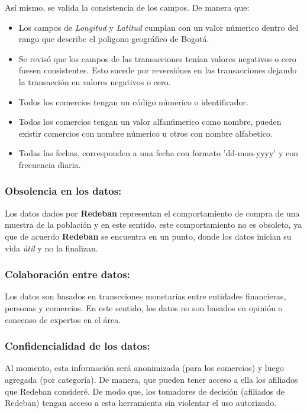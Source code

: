 \documentclass[a4paper]{article}
\begin{document}
Así mismo, se valida la consistencia de los campos. De manera que:

\begin{itemize}
	\item Los campos de \textit{Longitud} y \textit{Latitud} cumplan con un valor númerico dentro del rango que describe el poligono geográfico de Bogotá.
	\item Se revisó que los campos de las transacciones tenían valores negativos o cero fuesen consistentes. Esto sucede por reversiónes en las transacciones dejando la transacción en valores negativos o cero.
	\item Todos los comercios tengan un código númerico o identificador.
	\item Todos los comercios tengan un valor alfanúmerico como nombre, pueden existir comercios con nombre númerico u otros con nombre alfabetico.
	\item Todas las fechas, corresponden a una fecha con formato 'dd-mon-yyyy' y con frecuencia diaria.
\end{itemize}


\subsubsection*{Obsolencia en los datos:}

Los datos dados por \textbf{Redeban} representan el comportamiento de compra de una muestra de la población y
en este sentido, este comportamiento no es obsoleto, ya que de acuerdo \cite{ARTICLE:1} \textbf{Redeban} se encuentra en un punto,
donde los datos inician su vida \textit{útil} y no la finalizan.

\subsubsection*{Colaboración entre datos:}

Los datos son basados en transcciones monetarias entre entidades financieras, personas y comercios.
En este sentido, los datos no son basados en opinión o concenso de expertos en el área.

\subsubsection*{Confidencialidad de los datos:}

Al momento, esta información será anonimizada (para los comercios) y luego agregada (por categoría). De manera,
que pueden tener acceso a ella los afiliados que Redeban consideré. De modo que, los tomadores de decisión (afiliados de Redeban) tengan acceso a esta herramienta sin violentar el uso autorizado.\\
\\
\end{document}
